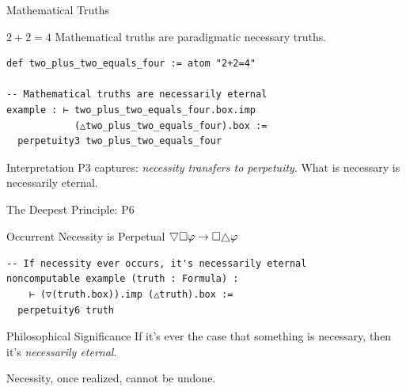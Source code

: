 \documentclass[aspectratio=169,11pt]{beamer}
\newcommand{\nec}{\Box}
\newcommand{\always}{\ensuremath \raisebox{-1.3pt}{$\triangle$}}
\newcommand{\sometimes}{\ensuremath \raisebox{1.3pt}{\rotatebox[origin=c]{180}{$\triangle$}}}
\newcommand{\imp}{\rightarrow}
\begin{document}
\begin{frame}[fragile]{Mathematical Truths}

\begin{block}{$2 + 2 = 4$}
Mathematical truths are paradigmatic necessary truths.
\end{block}

\begin{lstlisting}
def two_plus_two_equals_four := atom "2+2=4"

-- Mathematical truths are necessarily eternal
example : ⊢ two_plus_two_equals_four.box.imp
            (△two_plus_two_equals_four).box :=
  perpetuity3 two_plus_two_equals_four
\end{lstlisting}

\vspace{0.3cm}

\begin{block}{Interpretation}
P3 captures: \emph{necessity transfers to perpetuity}.
What is necessary is necessarily eternal.
\end{block}

\end{frame}

\begin{frame}[fragile]{The Deepest Principle: P6}

\begin{block}{Occurrent Necessity is Perpetual}
$\sometimes\nec\varphi \imp \nec\always\varphi$
\end{block}

\begin{lstlisting}
-- If necessity ever occurs, it's necessarily eternal
noncomputable example (truth : Formula) :
    ⊢ (▽(truth.box)).imp (△truth).box :=
  perpetuity6 truth
\end{lstlisting}

\vspace{0.3cm}

\begin{alertblock}{Philosophical Significance}
If it's ever the case that something is necessary, then it's \emph{necessarily eternal}.

Necessity, once realized, cannot be undone.
\end{alertblock}

\end{frame}

\end{document}
